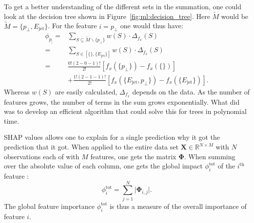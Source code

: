 \documentclass[a4paper, twoside, nobib]{tufte-book}
\newcommand{\abs}[1]{\lvert#1\rvert}
\renewcommand{\vec}[1]{\mathbf{#1}}
\begin{document}
To get a better understanding of the different sets in the summation, one could look at the decision tree shown in Figure~\ref{fig:ml:decision_tree}. Here $\widetilde{M}$ would be $\widetilde{M}=\{p_\perp, E_\mathrm{jet} \}$. For the feature $i=p_\perp $ one would thus have:
\begin{equation}
  \begin{split}
    \phi_{p_\vert} = & \sum_{S \subseteq \widetilde{M} \backslash \{p_\perp \}} w(S)  \cdot\Delta_{f_x}(S)  \\
                   = & \sum_{S \in \left[\{\}, \{E_\mathrm{jet}\} \right]} w(S)  \cdot\Delta_{f_x}(S)  \\
                   = & \frac{0! (2-0-1)!}{2!}  [ f_x(\{p_\perp\}) - f_x(\{\})]  \\ 
                     & +    \frac{1! (2-1-1)!}{2!}  [f_x(\{ E_\mathrm{jet}, p_\perp \}) - f_x(\{ E_\mathrm{jet} \})].
  \end{split}
\end{equation}
Whereas $w(S)$ are easily calculated, $\Delta_{f_x}$ depends on the data. As the number of features grows, the number of terms in the sum grows exponentially. What \citet{lundbergConsistentIndividualizedFeature2019} did was to develop an efficient algorithm that could solve this for trees in polynomial time. 

SHAP values allows one to explain for a single prediction why it got the prediction that it got. When applied to the entire data set $\vec{X} \in \mathbb{R}^{N \times M}$ with $N$ observations each of with $M$ features, one gets the matrix $\bm{\Phi}$. When summing over the absolute value of each column, one gets the global impact $\phi_i^\mathrm{tot}$ of the $i^{\mathrm{th}}$ feature \citep{lundbergConsistentIndividualizedFeature2019}:
\begin{equation}
  \phi_i^\mathrm{tot} = \sum_{j=1}^N \abs{ \bm{\Phi}_{i, j} }.
\end{equation}
The global feature importance $\phi_i^\mathrm{tot}$ is thus a measure of the overall importance of feature $i$. 
\end{document}
